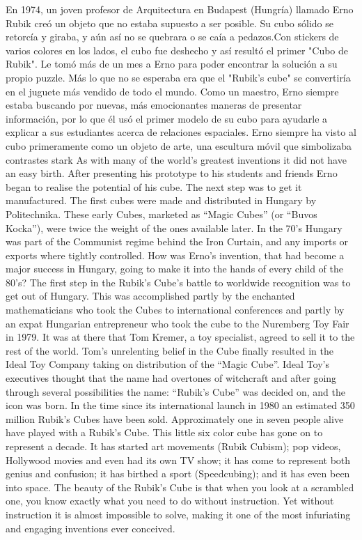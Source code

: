 \documentclass[12pt, letterpaper]{article}
\begin{document}
En 1974, un joven profesor de Arquitectura en Budapest (Hungría) llamado Erno Rubik creó un objeto que no estaba supuesto a ser posible.
Su cubo sólido se retorcía y giraba, y aún así no se quebrara o se caía a pedazos.Con stickers de varios colores en los lados, el cubo fue deshecho y así resultó el primer "Cubo de Rubik". Le tomó más de un mes a Erno para poder encontrar la solución a su propio puzzle. Más lo que no se esperaba era que el "Rubik's cube" se convertiría en el juguete más vendido de todo el mundo. Como un maestro, Erno siempre estaba buscando por nuevas, más emocionantes maneras de presentar información, por lo que él usó el primer modelo de su cubo para ayudarle a explicar a sus estudiantes acerca de relaciones espaciales. Erno siempre ha visto al cubo primeramente como un objeto de arte, una escultura móvil que simbolizaba contrastes stark 
As with many of the world’s greatest inventions it did not have an easy birth. After presenting his prototype to his students and friends Erno began to realise the potential of his cube. The next step was to get it manufactured. The first cubes were made and distributed in Hungary by Politechnika. These early Cubes, marketed as “Magic Cubes” (or “Buvos Kocka”), were twice the weight of the ones available later. In the 70’s Hungary was part of the Communist regime behind the Iron Curtain, and any imports or exports where tightly controlled. How was Erno’s invention, that had become a major success in Hungary, going to make it into the hands of every child of the 80’s? The first step in the Rubik’s Cube’s battle to worldwide recognition was to get out of Hungary. This was accomplished partly by the enchanted mathematicians who took the Cubes to international conferences and partly by an expat Hungarian entrepreneur who took the cube to the Nuremberg Toy Fair in 1979. It was at there that Tom Kremer, a toy specialist, agreed to sell it to the rest of the world. Tom’s unrelenting belief in the Cube finally resulted in the Ideal Toy Company taking on distribution of the “Magic Cube”. Ideal Toy’s executives thought that the name had overtones of witchcraft and after going through several possibilities the name: “Rubik’s Cube” was decided on, and the icon was born. In the time since its international launch in 1980 an estimated 350 million Rubik’s Cubes have been sold. Approximately one in seven people alive have played with a Rubik’s Cube. This little six color cube has gone on to represent a decade. It has started art movements (Rubik Cubism); pop videos, Hollywood movies and even had its own TV show; it has come to represent both genius and confusion; it has birthed a sport (Speedcubing); and it has even been into space. The beauty of the Rubik’s Cube is that when you look at a scrambled one, you know exactly what you need to do without instruction. Yet without instruction it is almost impossible to solve, making it one of the most infuriating and engaging inventions ever conceived.
\end{document}
